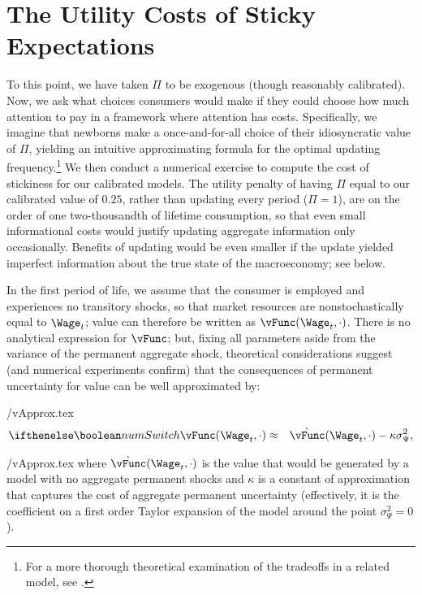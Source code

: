 

\hypertarget{Utility-Costs-Of-Sticky-Expectations}{}
\section{The Utility Costs of Sticky Expectations}\label{sec:uCost}

To this point, we have taken $\Pi$ to be exogenous (though reasonably calibrated).  Now, we ask what choices consumers would make if they could choose how much attention to pay in a framework where attention has costs.  Specifically, we imagine that newborns make a once-and-for-all choice of their idiosyncratic value of $\Pi$, yielding an intuitive approximating formula for the optimal updating frequency.\footnote{For a more thorough theoretical examination of the tradeoffs in a related model, see \cite{reis:inattentive}.}  We then conduct a numerical exercise to compute the cost of stickiness for our calibrated models.  The utility penalty of having $\Pi$ equal to our calibrated value of $0.25$, rather than updating every period ($\Pi=1$), are on the order of one two-thousandth of lifetime consumption, so that even small informational costs would justify updating aggregate information only occasionally.  Benefits of updating would be even smaller if the update yielded imperfect information about the true state of the macroeconomy; see below.

In the first period of life, we assume that the consumer is employed and experiences no transitory shocks, so that market resources are nonstochastically equal to $\Wage_t$; value can therefore be written as $\vFunc(\Wage_t,\cdot)$.  There is no analytical expression for $\vFunc$; but, fixing all parameters aside from the variance of the permanent aggregate shock, theoretical considerations suggest (and numerical experiments confirm) that the consequences of permanent uncertainty for value can be well approximated by:
\begin{verbatimwrite}{\eq/vApprox.tex}
  \begin{eqnarray*}
    \ifnumSw  \vFunc(\Wage_t,\cdot) & \approx & \grave{\vFunc}(\Wage_t,\cdot) - \kappa \sigma^{2}_{\Psi}, \label{eq:vApprox}
  \end{eqnarray*}
\end{verbatimwrite}
 {\eq/vApprox.tex} where $\grave{\vFunc}(\Wage_t,\cdot)$ is the value that would be generated by a model with no aggregate permanent shocks and $\kappa$ is a constant of approximation that captures the cost of aggregate permanent uncertainty (effectively, it is the coefficient on a first order Taylor expansion of the model around the point $\sigma_{\Psi}^{2}=0$).


